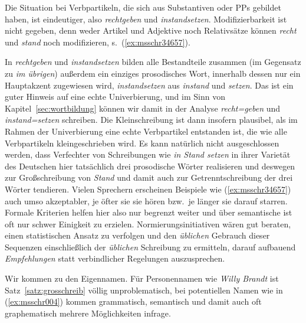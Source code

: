 Die Situation bei Verbpartikeln, die sich aus Substantiven oder PPs gebildet haben, ist eindeutiger, also \zB \textit{rechtgeben} und \textit{instandsetzen}.
Modifizierbarkeit ist nicht gegeben, denn weder Artikel und Adjektive noch Relativsätze können \textit{recht} und \textit{stand} noch modifizieren, s.\ (\ref{ex:msschr34657}).

\begin{exe}
  \ex\label{ex:msschr34657}
  \begin{xlist}
  \end{xlist}
\end{exe}

In \textit{rechtgeben} und \textit{instandsetzen} bilden alle Bestandteile zusammen (im Gegensatz zu \textit{im übrigen}) außerdem ein einziges prosodisches Wort, innerhalb dessen nur ein Hauptakzent zugewiesen wird, \zB \textit{in\Akz standsetzen} aus \textit{in\Akz stand} und \textit{\Akz setzen}.
Das ist ein guter Hinweis auf eine echte Univerbierung, und im Sinn von Kapitel~\ref{sec:wortbildung} können wir damit in der Analyse \textit{recht=geben} und \textit{instand=setzen} schreiben.
Die Kleinschreibung ist dann insofern plausibel, als im Rahmen der Univerbierung eine echte Verbpartikel entstanden ist, die wie alle Verbpartikeln kleingeschrieben wird.
Es kann natürlich nicht ausgeschlossen werden, dass Verfechter von Schreibungen wie \textit{in Stand setzen} in ihrer Varietät des Deutschen hier tatsächlich drei prosodische Wörter realisieren und deswegen zur Großschreibung von \textit{Stand} und damit auch zur Getrenntschreibung der drei Wörter tendieren.
Vielen Sprechern erscheinen Beispiele wie (\ref{ex:msschr34657}) auch umso akzeptabler, je öfter sie sie hören bzw.\ je länger sie darauf starren.
Formale Kriterien helfen hier also nur begrenzt weiter und über semantische ist oft nur schwer Einigkeit zu erzielen.
Normierungsinitiativen wären gut beraten, einen statistischen Ansatz zu verfolgen und den \textit{üblichen} Gebrauch dieser Sequenzen einschließlich der \textit{üblichen} Schreibung zu ermitteln, darauf aufbauend \textit{Empfehlungen} statt verbindlicher Regelungen auszusprechen.

Wir kommen zu den Eigennamen.
Für Personennamen wie \textit{Willy Brandt} ist Satz~\ref{satz:grosschreib} völlig unproblematisch, bei potentiellen Namen wie in (\ref{ex:msschr004}) kommen grammatisch, semantisch und damit auch oft graphematisch mehrere Möglichkeiten infrage.

